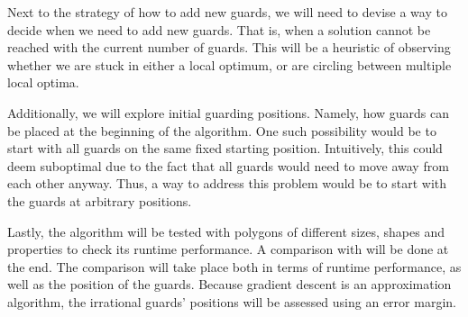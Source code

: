 Next to the strategy of how to add new guards, we will need to devise a way to decide when we need to add new guards. That is, when a solution cannot be reached with the current number of guards. This will be a heuristic of observing whether we are stuck in either a local optimum, or are circling between multiple local optima.

Additionally, we will explore initial guarding positions. Namely, how guards can be placed at the beginning of the algorithm. One such possibility would be to start with all guards on the same fixed starting position. Intuitively, this could deem suboptimal due to the fact that all guards would need to move away from each other anyway. Thus, a way to address this problem would be to start with the guards at arbitrary positions.

Lastly, the algorithm will be tested with polygons of different sizes, shapes and properties to check its runtime performance. A comparison with \cite{DBLP:journals/corr/abs-2007-06920} will be done at the end. The comparison will take place both in terms of runtime performance, as well as the position of the guards. Because gradient descent is an approximation algorithm, the irrational guards' positions will be assessed using an error margin.


